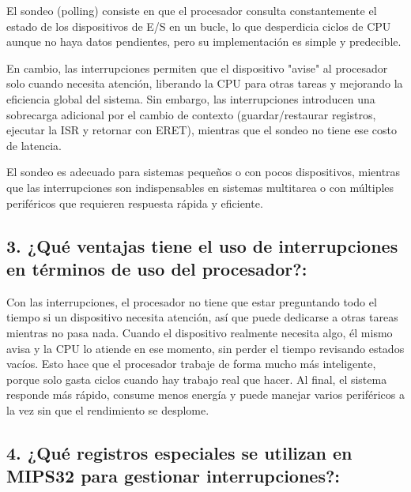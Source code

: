 \documentclass[12pt]{article}
\begin{document}
El sondeo (polling) consiste en que el procesador consulta constantemente el estado de los dispositivos de E/S en un bucle, lo que desperdicia ciclos de CPU aunque no haya datos pendientes, pero su implementación es simple y predecible.

En cambio, las interrupciones permiten que el dispositivo "avise" al procesador solo cuando necesita atención, liberando la CPU para otras tareas y mejorando la eficiencia global del sistema. Sin embargo, las interrupciones introducen una sobrecarga adicional por el cambio de contexto (guardar/restaurar registros, ejecutar la ISR y retornar con ERET), mientras que el sondeo no tiene ese costo de latencia.

El sondeo es adecuado para sistemas pequeños o con pocos dispositivos, mientras que las interrupciones son indispensables en sistemas multitarea o con múltiples periféricos que requieren respuesta rápida y eficiente.

\vspace{0.5cm}

\begin{center}
\subsection*{3. ¿Qué ventajas tiene el uso de interrupciones en términos de uso del procesador?:}
\end{center}

Con las interrupciones, el procesador no tiene que estar preguntando todo el tiempo si un dispositivo necesita atención, así que puede dedicarse a otras tareas mientras no pasa nada. Cuando el dispositivo realmente necesita algo, él mismo avisa y la CPU lo atiende en ese momento, sin perder el tiempo revisando estados vacíos. Esto hace que el procesador trabaje de forma mucho más inteligente, porque solo gasta ciclos cuando hay trabajo real que hacer. Al final, el sistema responde más rápido, consume menos energía y puede manejar varios periféricos a la vez sin que el rendimiento se desplome.

\begin{center}
\subsection*{4. ¿Qué registros especiales se utilizan en MIPS32 para gestionar interrupciones?:}
\end{center}
\end{document}
